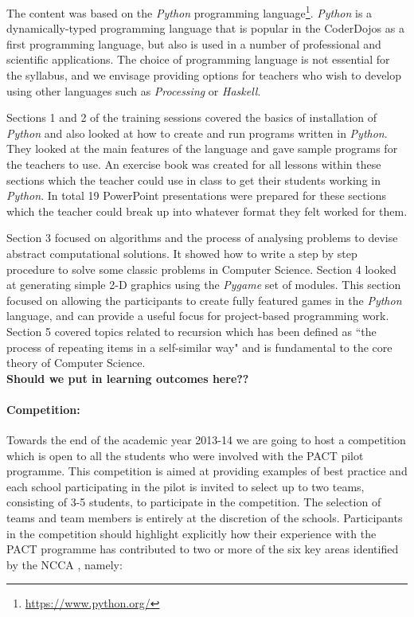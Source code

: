 \documentclass[a4paper]{article}
\begin{document}
The content was based on the \textit{Python} programming language\footnote{\url{https://www.python.org/}}. 
\textit{Python} is a dynamically-typed programming language that is popular in the CoderDojos as a first programming language, but also is used in a number of professional and scientific applications.  The choice of programming language is not essential for the syllabus, and we envisage providing options for teachers who wish to develop using other languages such as \textit{Processing} or \textit{Haskell}.

Sections 1 and 2 of the training sessions covered the basics of installation of \textit{Python} and also looked at how to create and run programs written in \textit{Python}. They looked at the main features of the language and gave sample programs for the teachers to use. 
An exercise book was created for all lessons within these sections which the teacher could use in class to get their students working in \textit{Python}. In total 19 PowerPoint presentations were prepared for these sections which the teacher could break up into whatever format they felt worked for them. 

Section 3 focused on algorithms and the process of analysing problems to devise abstract computational solutions.  It showed how to write a step by step procedure to solve some classic problems in Computer Science. Section 4 looked at generating simple 2-D graphics using the \textit{Pygame} set of modules. This section focused on allowing the participants to create fully featured games in the \textit{Python} language, and can provide a useful focus for project-based programming work.  Section 5 covered topics related to recursion which has been defined as ``the process of repeating items in a self-similar way" and is fundamental to the core theory of Computer Science. \\


\textbf{Should we put in learning outcomes here??}
\newline


\paragraph{Competition:}
Towards the end of the academic year 2013-14 we are going to host a competition which is open to all the students who were involved with the PACT pilot programme. This competition is aimed at providing examples of best practice and each school participating in the pilot is invited to select up to two teams, consisting of 3-5 students, to participate in the competition. The selection of teams and team members is entirely at the discretion of the schools. Participants in the competition should highlight explicitly how their experience with the PACT programme has contributed to two or more of the six key areas identified by the NCCA \cite{ncca2013}, namely:
\end{document}
